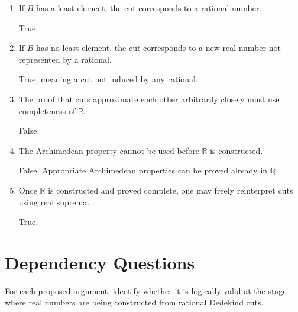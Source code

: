 \documentclass{self-check}
\begin{document}
\begin{enumerate}[label=\arabic*., itemsep=10pt]
\item If $B$ has a least element, the cut corresponds to a rational number.

\begin{answer}
True.
\end{answer}

\item If $B$ has no least element, the cut corresponds to a new real number not represented by a rational.

\begin{answer}
True, meaning a cut not induced by any rational.
\end{answer}

\item The proof that cuts approximate each other arbitrarily closely must use completeness of $\mathbb{R}$.

\begin{answer}
False.
\end{answer}

\item The Archimedean property cannot be used before $\mathbb{R}$ is constructed.

\begin{answer}
False. Appropriate Archimedean properties can be proved already in $\mathbb{Q}$.
\end{answer}

\item Once $\mathbb{R}$ is constructed and proved complete, one may freely reinterpret cuts using real suprema.

\begin{answer}
True.
\end{answer}

\end{enumerate}

\section{Dependency Questions}

For each proposed argument, identify whether it is logically valid at the stage where real numbers are being constructed from rational Dedekind cuts.
\end{document}
